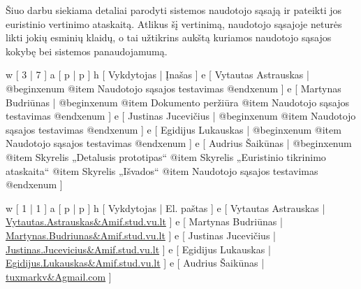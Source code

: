 
Šiuo darbu siekiama detaliai parodyti sistemos naudotojo sąsają ir pateikti jos
euristinio vertinimo ataskaitą. Atlikus šį vertinimą, naudotojo sąsajoje neturės
likti jokių esminių klaidų, o tai užtikrins aukštą kuriamos naudotojo sąsajos
kokybę bei sistemos panaudojamumą.

\xtable
{
  w [ 3  | 7 ]
  a [ p  | p ]
  h [ Vykdytojas | Įnašas ]
  e [ Vytautas Astrauskas
  | @begin{xenum} 
      @item Naudotojo sąsajos testavimas
    @end{xenum}
  ]
  e [ Martynas Budriūnas
  | @begin{xenum} 
      @item Dokumento peržiūra
      @item Naudotojo sąsajos testavimas
    @end{xenum}
  ]
  e [ Justinas Jucevičius 
  | @begin{xenum} 
      @item Naudotojo sąsajos testavimas
    @end{xenum}
  ]
  e [ Egidijus Lukauskas 
  | @begin{xenum} 
      @item Naudotojo sąsajos testavimas
    @end{xenum}
  ]
  e [ Audrius Šaikūnas 
  | @begin{xenum} 
      @item Skyrelis „Detalusis prototipas“
      @item Skyrelis „Euristinio tikrinimo ataskaita“
      @item Skyrelis „Išvados“
      @item Naudotojo sąsajos testavimas
    @end{xenum}
  ]
}

\xtableu
{
  w [ 1 | 1 ]
  a [ p | p ]
  h [ Vykdytojas | El. paštas ]
  e [ Vytautas Astrauskas | \url{Vytautas.Astrauskas&Amif.stud.vu.lt} ]
  e [ Martynas Budriūnas  | \url{Martynas.Budriunas&Amif.stud.vu.lt} ]
  e [ Justinas Jucevičius | \url{Justinas.Jucevicius&Amif.stud.vu.lt} ]
  e [ Egidijus Lukauskas  | \url{Egidijus.Lukauskas&Amif.stud.vu.lt} ]
  e [ Audrius Šaikūnas    | \url{tuxmarkv&Agmail.com} ]
}
